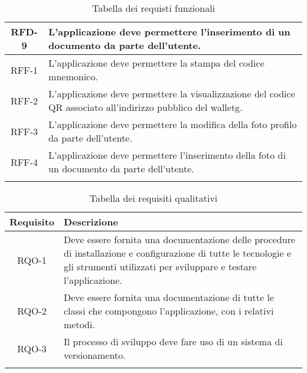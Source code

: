 \begin{longtable}{|c|p{10.5cm}|}
	\hline
	RFD-9     & L'applicazione deve permettere l'inserimento di un documento da parte dell'utente. \\
	\hline
	RFF-1     & L'applicazione deve permettere la stampa del codice mnemonico. \\
	\hline
	RFF-2     & L'applicazione deve permettere la visualizzazione del codice QR associato all'indirizzo pubblico del \gls{walletg}. \\
	\hline
	RFF-3     & L'applicazione deve permettere la modifica della foto profilo da parte dell'utente. \\
	\hline
	RFF-4     & L'applicazione deve permettere l'inserimento della foto di un documento da parte dell'utente. \\
	\hline
	
	\caption{Tabella dei requisti funzionali}
	\label{tab:requisiti-funzionali}
\end{longtable}

\begin{longtable}{|c|p{10.5cm}|}
	\hline
	\rowcolor{gray}
	\textbf{Requisito} & \textbf{Descrizione} \\
	\hline
	RQO-1    & Deve essere fornita una documentazione delle procedure di installazione e configurazione di tutte le tecnologie e gli strumenti utilizzati per sviluppare e testare l'applicazione. \\
	\hline
	RQO-2    & Deve essere fornita una documentazione di tutte le classi che compongono l'applicazione, con i relativi metodi. \\
	\hline
	RQO-3    & Il processo di sviluppo deve fare uso di un sistema di versionamento. \\
	\hline
	
	\caption{Tabella dei requisiti qualitativi}
	\label{tab:requisiti-qualitativi}
\end{longtable}

